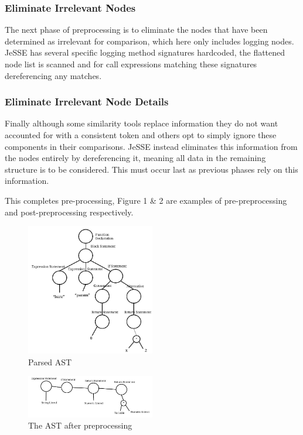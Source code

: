 \documentclass[jou,apacite]{apa6}
\begin{document}
\subsubsection{Eliminate Irrelevant Nodes}
The next phase of preprocessing is to eliminate the nodes that have been determined as irrelevant for comparison, which here only includes logging nodes. JeSSE has several specific logging method signatures hardcoded, the flattened node list is scanned and for call expressions matching these signatures dereferencing any matches.

\subsubsection{Eliminate Irrelevant Node Details}
Finally although some similarity tools replace information they do not want accounted for with a consistent token and others opt to simply ignore these components in their comparisons. JeSSE instead eliminates this information from the nodes entirely by dereferencing it, meaning all data in the remaining structure is to be considered. This must occur last as previous phases rely on this information. 

This completes pre-processing, Figure 1 \& 2 are examples of pre-preprocessing and post-preprocessing respectively.

\begin{figure}[h]
\caption{Parsed AST}
\centering
\includegraphics[width=0.5\textwidth]{ast1}
\end{figure}

\begin{figure}[h]
\caption{The AST after preprocessing}
\centering
\includegraphics[width=0.50\textwidth]{ast2}
\end{figure}
\end{document}
